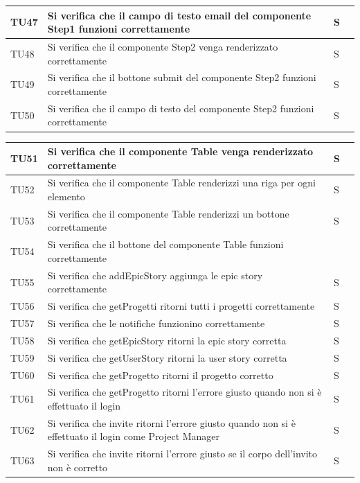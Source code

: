 \documentclass{article}
\begin{document}
\begin{center}
\begin{tabular}{P{5em} P{21em} P{6em} P{6em}}
    \hline{}
     TU47 & Si verifica che il campo di testo email del componente Step1 funzioni correttamente     & S\\
    \hline
    TU48& Si verifica che il componente Step2 venga renderizzato correttamente   & S\\
    \hline{}
     TU49 & Si verifica che il bottone submit del componente Step2 funzioni correttamente   &S \\
    \hline
    TU50&  Si verifica che il campo di testo del componente Step2 funzioni correttamente & S\\
     \end{tabular}
        \end{center}
    \begin{center}
    \begin{tabular}{P{5em} P{21em} P{6em} P{6em}}
     \hline{}
     TU51 & Si verifica che il componente Table venga renderizzato correttamente  &S   \\
    \hline
    TU52& Si verifica che il componente Table renderizzi una riga per ogni elemento   &S \\
     \hline{}
     TU53 &   Si verifica che il componente Table renderizzi un bottone correttamente  &S \\
     \hline
    TU54& Si verifica che il bottone del componente Table funzioni correttamente    & \\
    \hline{}
     TU55 &   Si verifica che addEpicStory aggiunga le epic story  correttamente   &S \\
     \hline
    TU56& Si verifica che getProgetti ritorni tutti i progetti correttamente   & S\\
     \hline{}
     TU57 &   Si verifica che le notifiche funzionino correttamente  &S \\
     \hline
    TU58&  Si verifica che getEpicStory ritorni la epic story corretta     &S \\
    \hline{}
     TU59 &   Si verifica che getUserStory ritorni la user story corretta    & S\\
     \hline
    TU60&  Si verifica che getProgetto ritorni il progetto corretto   & S\\
    \hline{}
     TU61 &   Si verifica che getProgetto ritorni l'errore giusto quando non si è effettuato il login   & S\\
     \hline
    TU62&  Si verifica che invite ritorni l'errore giusto quando non si è effettuato il login come Project Manager  & S\\
     \hline{}
     TU63 &    Si verifica che invite ritorni l'errore giusto se il corpo dell'invito non è corretto  &S \\
    \end{tabular}
\end{center}
\end{document}
